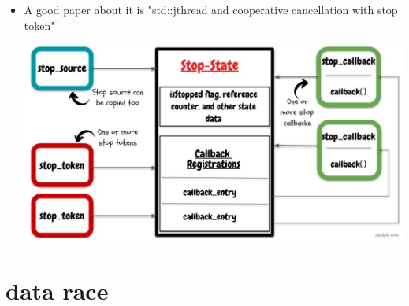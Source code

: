 \documentclass[a4paper,11pt,twoside]{book}
\begin{document}
\begin{itemize}
\item A good paper about it is "std::jthread and cooperative cancellation with stop token"
		
\includegraphics[width=0.85\linewidth]{pics/stop_token.jpg}
	
	
\end{itemize}

\section{data race}
\end{document}
